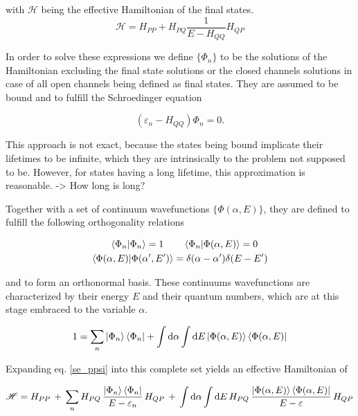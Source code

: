 with $\mathscr{H}$ being the effective Hamiltonian of the final states.
\begin{equation}
  \mathscr{H} = H_{PP} + H_{PQ} \frac{1}{E-H_{QQ}} H_{QP}
\end{equation}

In order to solve these expressions we define $\{\Phi_n\}$ to be the solutions
of the Hamiltonian excluding the final state solutions or the closed channels
solutions in case of all open channels being defined as final states.
They are assumed to be bound and to fulfill the
Schroedinger equation

\begin{equation}
  (\varepsilon_n - H_{QQ}) \Phi_n = 0 .
\end{equation}

This approach is not exact, because the states being bound implicate
their lifetimes to be infinite, which they are intrinsically
to the problem not supposed to be. However, for states having a long lifetime,
this approximation is reasonable. -> How long is long?

Together with a set of continuum wavefunctions $\{\Phi(\alpha,E)\}$, they are
defined to fulfill the following orthogonality relations

\begin{align}
  \braket{\Phi_n|\Phi_n} = 1 \quad  & \quad \braket{\Phi_n|\Phi(\alpha,E)} = 0\\
  \braket{\Phi(\alpha,E)|\Phi(\alpha',E')} & = \delta(\alpha-\alpha') \delta(E-E')
\end{align}

and to form an orthonormal basis. These continuums wavefunctions are characterized
by their energy $E$ and their quantum numbers, which are at this stage embraced
to the variable $\alpha$.

\begin{equation}
  1 = \sum\limits_n \ket{\Phi_n}\bra{\Phi_n} + \int \mathrm{d}\alpha \int \mathrm{d}E
      \ket{\Phi(\alpha,E)}\bra{\Phi(\alpha,E)} \label{feshbach_1}
\end{equation}

Expanding eq. \ref{se_ppsi} into this complete set yields an effective Hamiltonian
of

\begin{equation}
  \mathscr{H} = H_{PP}\, + \,
  \sum\limits_n H_{PQ} \,\frac{\ket{\Phi_n}\bra{\Phi_n}}{E-\varepsilon_n}\, H_{QP} \,+\,
  \int \mathrm{d}\alpha \int\mathrm{d}E \,H_{PQ} \,
  \frac{\ket{\Phi(\alpha,E)}\bra{\Phi(\alpha,E)}}{E-\varepsilon} \, H_{QP}
\end{equation}

